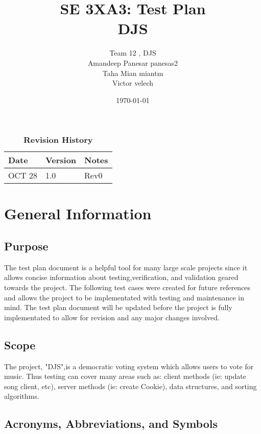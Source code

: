 \documentclass[12pt, titlepage]{article}
\title{SE 3XA3: Test Plan\\DJS}
\author{Team 12 , DJS
		\\ Amandeep Panesar panesas2
		\\ Taha Mian miantm
		\\ Victor velech
}
\date{\today}
\begin{document}
\maketitle

\tableofcontents
\listoftables
\listoffigures

\begin{table}[bp]
\caption{\bf Revision History}
\begin{tabularx}{\textwidth}{p{3cm}p{2cm}X}
\toprule {\bf Date} & {\bf Version} & {\bf Notes}\\
\midrule
OCT 28 & 1.0 & Rev0\\

\bottomrule
\end{tabularx}
\end{table}

\newpage



\section{General Information}

\subsection{Purpose}
The test plan document is a helpful tool for many large scale projects since it allows concise information about testing,verification, and validation geared towards the project. The following test cases were created for future references and allows the project to be implementated with testing and maintenance in mind. The test plan document will be updated before the project is fully implementated to allow for revision and any major changes involved.

\subsection{Scope}
The project, "DJS",is a democratic voting system which allows users to vote for music. Thus testing can cover many areas such as: client methods (ie: update song client, etc), server methods (ie: create Cookie), data structures, and sorting algorithms. 

\subsection{Acronyms, Abbreviations, and Symbols}
\end{document}
